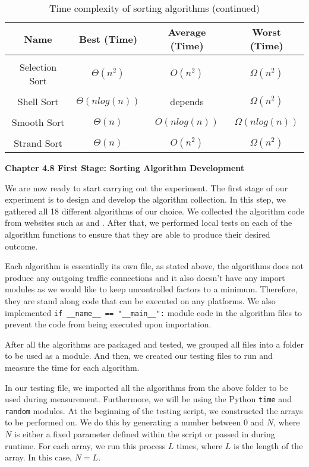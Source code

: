 \begin{table}[h!]
\centering
\begin{tabular}{||c c c c||} 
\hline
Name & Best (Time) & Average (Time) & Worst (Time) \\ [1ex] 
\hline\hline
 & & & \\
Selection Sort & \(\Theta(n^2)\) & \(O(n^2)\) & \(\Omega(n^2)\) \\ 
 & & & \\
Shell Sort & \(\Theta(nlog(n))\) & depends & \(\Omega(n^2)\) \\ 
 & & & \\
Smooth Sort & \(\Theta(n)\) & \(O(nlog(n))\) & \(\Omega(nlog(n))\) \\ 
 & & & \\
Strand Sort & \(\Theta(n)\) & \(O(n^2)\) & \(\Omega(n^2)\) \\ [1ex]
\hline
\end{tabular}
\caption{Time complexity of sorting algorithms (continued)}
\label{table:time_complexity_2}
\end{table}
\bigskip

\bigskip
\textbf{{\Large Chapter 4.8 First Stage: Sorting Algorithm Development}}

We are now ready to start carrying out the experiment. The first stage of our experiment is to design and develop the algorithm collection. In this step, we gathered all 18 different algorithms of our choice. We collected the algorithm code from websites such as \href{https://www.geeksforgeeks.org/}{\color{blue}{geeksforgeeks.org}} and \href{https://www.programiz.com/}{\color{blue}{programiz.com}}. After that, we performed local tests on each of the algorithm functions to ensure that they are able to produce their desired outcome.

Each algorithm is essentially its own file, as stated above, the algorithms does not produce any outgoing traffic connections and it also doesn't have any import modules as we would like to keep uncontrolled factors to a minimum. Therefore, they are stand along code that can be executed on any platforms. We also implemented \texttt{if __name__ == "__main__":} module code in the algorithm files to prevent the code from being executed upon importation.

After all the algorithms are packaged and tested, we grouped all files into a folder to be used as a module. And then, we created our testing files to run and measure the time for each algorithm.

In our testing file, we imported all the algorithms from the above folder to be used during measurement. Furthermore, we will be using the Python \texttt{time} and \texttt{random} modules. At the beginning of the testing script, we constructed the arrays to be performed on. We do this by generating a number between 0 and \(N\), where \(N\) is either a fixed parameter defined within the script or passed in during runtime. For each array, we run this process \(L\) times, where \(L\) is the length of the array. In this case, \(N = L\).

